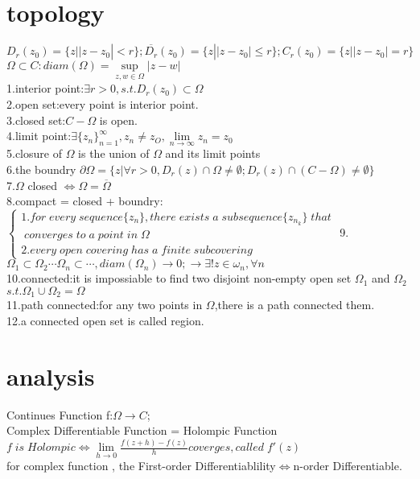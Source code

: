 \documentclass[12pt, a4paper, oneside]{ctexart}
\begin{document}
\section*{topology}
$D_r(z_0)=\{z||z-z_0|<r\};\overline{D_r}(z_0)=\{z||z-z_0|\leq r\};C_r(z_0)=\{z||z-z_0|=r\}$\\
$\Omega\subset C:diam(\Omega)=\sup\limits_{z,w\in \Omega}|z-w|$\\
1.interior point:$\exists r>0,s.t.D_r(z_0)\subset \Omega$\\
2.open set:every point is interior point.\\
3.closed set:$C-\Omega$ is open.\\
4.limit point:$\exists \{z_n\}_{n=1}^\infty ,z_n\neq z_O,\lim\limits_{n\to\infty}z_n=z_0$\\
5.closure of $\Omega$ is the union of $\Omega$ and its limit points\\
6.the boundry $\partial{\Omega}=\{z|\forall r>0,D_r(z)\cap \Omega\neq\emptyset;D_r(z)\cap {(C-\Omega)}\neq\emptyset\}$\\
7.$\Omega$ closed $\iff \Omega=\overline{\Omega}$\\
8.compact = closed + boundry:$
    \begin{cases}
        1.for\;every\;sequence\{z_n\},there\;exists\;a\;subsequence\{z_{n_k}\}\;that\\\;converges\;to\;a\;point\;in\;\Omega\\
        2.every\;open\;covering\;has\;a\;finite\;subcovering
    \end{cases}$
9.$\Omega_1\subset\Omega_2\cdots\Omega_n\subset\cdots,diam(\Omega_n)\to 0;\rightarrow\exists !z\in\omega_n,\forall n$\\
10.connected:it is impossiable to find two disjoint non-empty open set $\Omega_1$ and $\Omega_2$ $s.t.\Omega_1\cup \Omega_2=\Omega$\\
11.path connected:for any two points in $\Omega$,there is a path connected them.\\
12.a connected open set is called region.

\section*{analysis}
Continues Function f:$\Omega\to C$;\\
Complex Differentiable Function = Holompic Function\\
$f\;is\;Holompic\iff\lim\limits_{h\to 0}\frac{f(z+h)-f(z)}{h}coverges,called\;f'(z)$ \\
for complex function , the First-order Differentiablility$\iff$n-order Differentiable.\\
\end{document}
